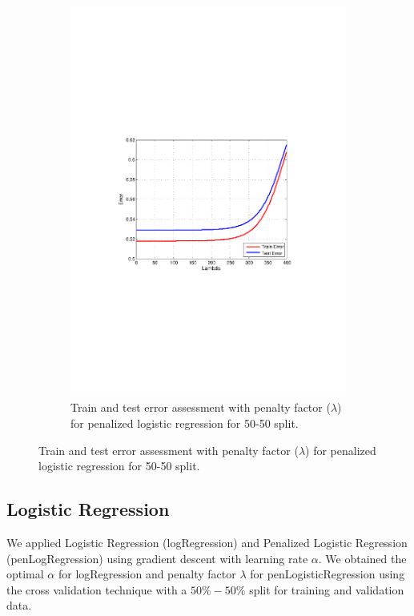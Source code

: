 \begin{figure}[h]
\begin{subfigure}[b]{0.45\textwidth}
   \includegraphics[clip, trim=4cm 9cm 3cm 10cm, width=\textwidth]{figures/Lambda_pLG.pdf}
    \caption{Train and test error assessment with penalty factor ($\lambda$) for penalized logistic regression
    for 50-50 split.}
    \label{fig:Lambda_pLr}
  \end{subfigure}
  \hfill
\end{figure}

\subsection{Logistic Regression}

We applied Logistic Regression (logRegression) and Penalized Logistic Regression (penLogRegression) using gradient descent with learning rate $\alpha$.  We obtained the optimal $\alpha$ for logRegression   and penalty factor $\lambda$ for penLogisticRegression using the cross validation technique with a $50\%-50\%$ split for training and validation data.

